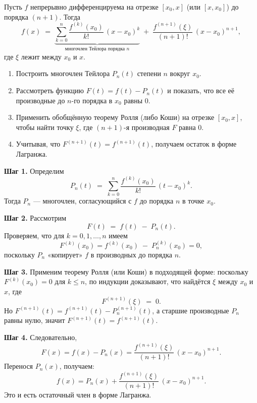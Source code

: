 
\begin{customtheorem}
	Пусть $f$ непрерывно дифференцируема на отрезке $[x_0,x]$ (или $[x,x_0]$) до порядка $(n+1)$. Тогда
	\[
		f(x)
		\;=\;
		\underbrace{
			\sum_{k=0}^n \frac{f^{(k)}(x_0)}{k!}\,(x-x_0)^k
		}_{\text{многочлен Тейлора порядка }n}
		\;+\;
		\frac{f^{(n+1)}(\xi)}{(n+1)!}\,(x - x_0)^{n+1},
	\]
	где $\xi$ лежит между $x_0$ и $x$.
\end{customtheorem}

\begin{proofplan}
	\begin{enumerate}
		\item Построить многочлен Тейлора $P_n(t)$ степени $n$ вокруг $x_0$.
		\item Рассмотреть функцию $F(t)=f(t)-P_n(t)$ и показать, что все её производные до $n$-го порядка в $x_0$ равны 0.
		\item Применить обобщённую теорему Ролля (либо Коши) на отрезке $[x_0,x]$, чтобы найти точку $\xi$, где $(n+1)$-я производная $F$ равна 0.
		\item Учитывая, что $F^{(n+1)}(t)=f^{(n+1)}(t)$, получаем остаток в форме Лагранжа.
	\end{enumerate}
\end{proofplan}

\begin{customproof}
	\textbf{Шаг 1.}
	Определим
	\[
		P_n(t)
		\;=\;
		\sum_{k=0}^n
		\frac{f^{(k)}(x_0)}{k!}\,(t - x_0)^k.
	\]
	Тогда $P_n$ — многочлен, согласующийся с $f$ до порядка $n$ в точке $x_0$.

	\smallskip

	\textbf{Шаг 2.}
	Рассмотрим
	\[
		F(t)
		\;=\;
		f(t)
		\;-\;
		P_n(t).
	\]
	Проверяем, что для $k=0,1,\dots,n$ имеем
	\[
		F^{(k)}(x_0)
		=
		f^{(k)}(x_0)
		\;-\;
		P_n^{(k)}(x_0)
		=
		0,
	\]
	поскольку $P_n$ «копирует» $f$ в производных до порядка $n$.

	\smallskip

	\textbf{Шаг 3.}
	Применим теорему Ролля (или Коши) в подходящей форме:
	поскольку $F^{(k)}(x_0)=0$ для $k\le n$, по индукции доказывают, что найдётся $\xi$ между $x_0$ и $x$, где
	\[
		F^{(n+1)}(\xi) \;=\; 0.
	\]
	Но $F^{(n+1)}(t) = f^{(n+1)}(t) - P_n^{(n+1)}(t)$, а старшие производные $P_n$ равны нулю, значит $F^{(n+1)}(t)=f^{(n+1)}(t)$.

	\smallskip

	\textbf{Шаг 4.}
	Следовательно,
	\[
		F(x)
		=
		f(x)-P_n(x)
		=
		\frac{f^{(n+1)}(\xi)}{(n+1)!}\,(x - x_0)^{n+1}.
	\]
	Перенося $P_n(x)$, получаем:
	\[
		f(x)
		=
		P_n(x)
		+
		\frac{f^{(n+1)}(\xi)}{(n+1)!}\,(x - x_0)^{n+1}.
	\]
	Это и есть остаточный член в форме Лагранжа.
\end{customproof}


